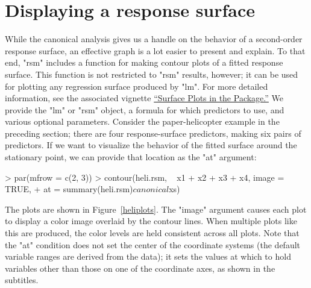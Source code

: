 \documentclass[article,nojss]{jss}
\def\rsm{\pkg{rsm}}
\begin{document}
\section{Displaying a response surface}\label{contour}
While the canonical analysis gives us a handle on the behavior of a second-order response surface, an effective graph is a lot easier to present and explain.  To that end, "rsm" includes a function for making contour plots of a fitted response surface.  This function is not restricted to "rsm" results, however; it can be used for plotting any regression surface produced by "lm".  For more detailed information, see the associated vignette \href{rsm-plots.pdf}{``Surface Plots in the \rsm{} Package.''}
We provide the "lm" or "rsm" object, a formula for which predictors to use, and various optional parameters.  Consider the paper-helicopter example in the preceding section; there are four response-surface predictors, making six pairs of predictors.  If we want to visualize the behavior of the fitted surface around the stationary point, we can provide that location as the "at" argument:
\begin{Schunk}
\begin{Sinput}
> par(mfrow = c(2, 3))
> contour(heli.rsm, ~ x1 + x2 + x3 + x4, image = TRUE,
+   at = summary(heli.rsm)$canonical$xs)
\end{Sinput}
\end{Schunk}
The plots are shown in Figure~\ref{heliplots}.  The "image" argument causes each plot to display a color image overlaid by the
contour lines.  When multiple plots like this are produced, the color levels are held consistent across all
plots.  Note that the "at" condition does not set the center of the coordinate systems (the default variable
ranges are derived from the data); it sets the values at which to hold variables other than those on one of
the coordinate axes, as shown in the subtitles.
\end{document}
